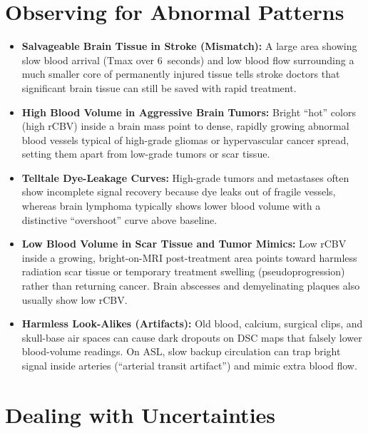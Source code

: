 \section{Observing for Abnormal Patterns}

\begin{itemize}
    \item \textbf{Salvageable Brain Tissue in Stroke (Mismatch):} A large area showing slow blood arrival (Tmax over 6~seconds) and low blood flow surrounding a much smaller core of permanently injured tissue tells stroke doctors that significant brain tissue can still be saved with rapid treatment.
    \item \textbf{High Blood Volume in Aggressive Brain Tumors:} Bright ``hot'' colors (high rCBV) inside a brain mass point to dense, rapidly growing abnormal blood vessels typical of high-grade gliomas or hypervascular cancer spread, setting them apart from low-grade tumors or scar tissue.
    \item \textbf{Telltale Dye-Leakage Curves:} High-grade tumors and metastases often show incomplete signal recovery because dye leaks out of fragile vessels, whereas brain lymphoma typically shows lower blood volume with a distinctive ``overshoot'' curve above baseline.
    \item \textbf{Low Blood Volume in Scar Tissue and Tumor Mimics:} Low rCBV inside a growing, bright-on-MRI post-treatment area points toward harmless radiation scar tissue or temporary treatment swelling (pseudoprogression) rather than returning cancer. Brain abscesses and demyelinating plaques also usually show low rCBV.
    \item \textbf{Harmless Look-Alikes (Artifacts):} Old blood, calcium, surgical clips, and skull-base air spaces can cause dark dropouts on DSC maps that falsely lower blood-volume readings. On ASL, slow backup circulation can trap bright signal inside arteries (``arterial transit artifact'') and mimic extra blood flow.
\end{itemize}

\section{Dealing with Uncertainties}

